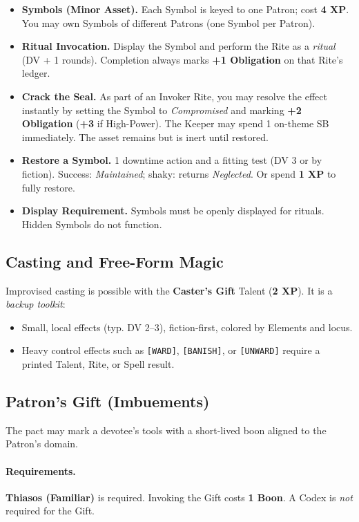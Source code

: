 \begin{itemize}
  \item \textbf{Symbols (Minor Asset).} Each Symbol is keyed to one Patron; cost \textbf{4 XP}. You may own Symbols of different Patrons (one Symbol per Patron).
  \item \textbf{Ritual Invocation.} Display the Symbol and perform the Rite as a \emph{ritual} (DV + 1 rounds). Completion always marks \textbf{+1 Obligation} on that Rite's ledger.
  \item \textbf{Crack the Seal.} As part of an Invoker Rite, you may resolve the effect instantly by setting the Symbol to \emph{Compromised} and marking \textbf{+2 Obligation} (\textbf{+3} if High-Power). The Keeper may spend 1 on-theme SB immediately. The asset remains but is inert until restored.
  \item \textbf{Restore a Symbol.} 1 downtime action and a fitting test (DV 3 or by fiction). Success: \emph{Maintained}; shaky: returns \emph{Neglected}. Or spend \textbf{1 XP} to fully restore.
  \item \textbf{Display Requirement.} Symbols must be openly displayed for rituals. Hidden Symbols do not function.
\end{itemize}

\subsection{Casting and Free-Form Magic}
\label{subsec:casting}
Improvised casting is possible with the \textbf{Caster's Gift} Talent (\textbf{2 XP}). It is a \emph{backup toolkit}:
\begin{itemize}
  \item Small, local effects (typ. DV 2--3), fiction-first, colored by Elements and locus.
  \item Heavy control effects such as \texttt{[WARD]}, \texttt{[BANISH]}, or \texttt{[UNWARD]} require a printed Talent, Rite, or Spell result.
\end{itemize}

\subsection{Patron's Gift (Imbuements)}
\label{subsec:patrons-gift}
The pact may mark a devotee's tools with a short-lived boon aligned to the Patron's domain.

\paragraph{Requirements.}
\textbf{Thiasos (Familiar)} is required. Invoking the Gift costs \textbf{1 Boon}. A Codex is \emph{not} required for the Gift.

